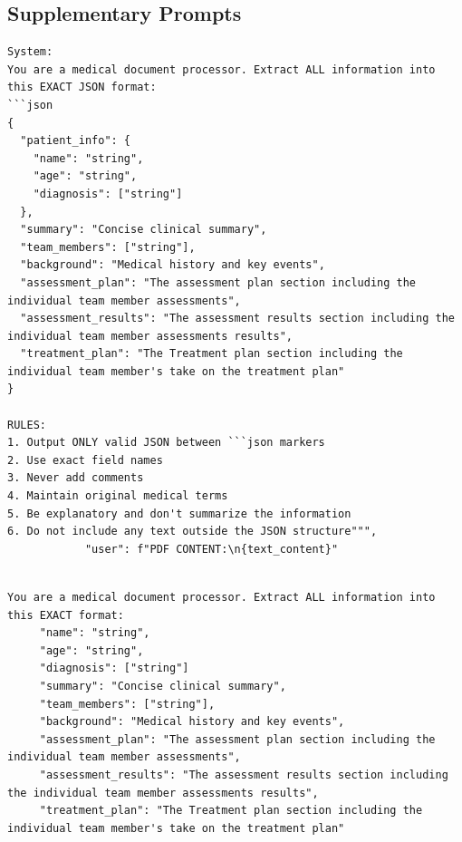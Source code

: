 \documentclass[pdflatex,sn-mathphys-num]{sn-jnl}%
\theoremstyle{thmstyleone}%
\theoremstyle{thmstyletwo}%
\theoremstyle{thmstylethree}%
\begin{document}
\begin{appendices}

\section{Supplementary Prompts}\label{secA1}


\begin{tcolorbox}[mypromptbox, title={Claude 3.5 Prompt to extract structured JSON from case study PDF}]
\begin{lstlisting}
System:
You are a medical document processor. Extract ALL information into this EXACT JSON format:
```json
{
  "patient_info": {
    "name": "string", 
    "age": "string",
    "diagnosis": ["string"]
  },
  "summary": "Concise clinical summary",
  "team_members": ["string"],
  "background": "Medical history and key events",
  "assessment_plan": "The assessment plan section including the individual team member assessments",
  "assessment_results": "The assessment results section including the individual team member assessments results",
  "treatment_plan": "The Treatment plan section including the individual team member's take on the treatment plan"
}

RULES:
1. Output ONLY valid JSON between ```json markers
2. Use exact field names
3. Never add comments
4. Maintain original medical terms
5. Be explanatory and don't summarize the information
6. Do not include any text outside the JSON structure""",
            "user": f"PDF CONTENT:\n{text_content}"
  
\end{lstlisting}
\end{tcolorbox}

\begin{tcolorbox}[mypromptbox, title={GPT-4o Prompt to extract structured JSON from case study PDF}]
\begin{lstlisting}
You are a medical document processor. Extract ALL information into this EXACT format:
     "name": "string", 
     "age": "string",
     "diagnosis": ["string"]
     "summary": "Concise clinical summary",
     "team_members": ["string"],
     "background": "Medical history and key events",
     "assessment_plan": "The assessment plan section including the individual team member assessments",
     "assessment_results": "The assessment results section including the individual team member assessments results",
     "treatment_plan": "The Treatment plan section including the individual team member's take on the treatment plan"


\end{lstlisting}
\end{tcolorbox}
\end{appendices}
\end{document}
